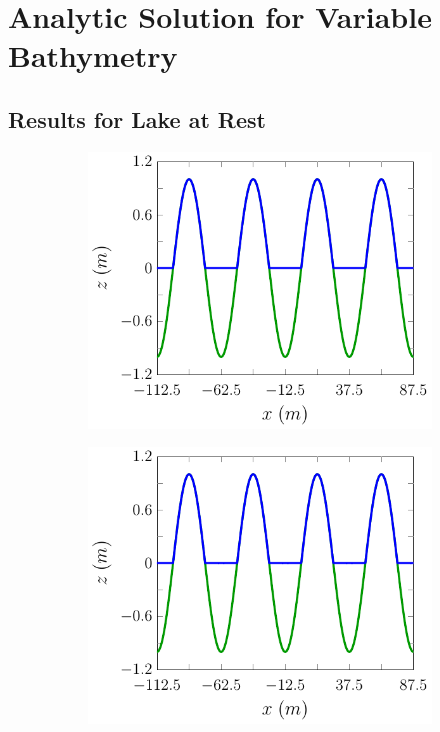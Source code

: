 \section{Analytic Solution for Variable Bathymetry}

\subsection{Results for Lake at Rest}


\begin{figure}
	\centering
	\begin{subfigure}{0.5\textwidth}
		\includegraphics[width=\textwidth]{./chp5/figures/Analytic/LakeAtRest/Example/FEVMWB.pdf}
		\vspace{0.5cm}
	\end{subfigure}%
	\begin{subfigure}{0.5\textwidth}
		\includegraphics[width=\textwidth]{./chp5/figures/Analytic/LakeAtRest/Example/FEVMnWB.pdf}

\end{subfigure}
\end{figure}
